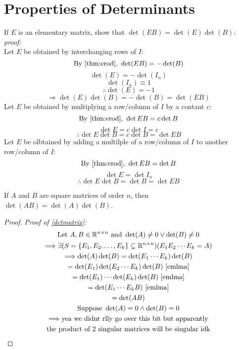 \section{Properties of Determinants}
\begin{lemma}\label{emlma}
    If \(E\) is an elementary matrix, show that \(\det(EB) =\det(E)\det(B)\):\\
    \emph{proof:}\\
    Let \(E\) be obtained by interchanging rows of \(I\):
    \[
        \text{By \ref{thm:erod}, } \det(EB)=-\det(B)
    \]
    \[
        \det(E)=-\det(I_n)
    \]
    \[
        \det(I_n)\equiv 1
    \]
    \[
        \therefore\det(E)=-1
    \]
    \[
        \Rightarrow \det(E)\det(B)=-\det(B)=\det(EB)
    \]
    Let \(E\) be obtained by multiplying a row/column of \(I\) by a contant \(c\):
    \[
        \text{By \ref{thm:erod}, } \det{EB}=c\det{B}
    \]
    \[
        \det{E}=c\det{I}=c
    \]
    \[
        \therefore\det{E}\det{B}=c\det{B}=\det{EB}
    \]
    Let \(E\) be olbtained by adding a multilple of a row/column of \(I\) to another row/column of \(I\):
    \[
        \text{By \ref{thm:erod}, } \det{EB}=\det{B}
    \]
    \[
        \det{E}=\det{I_n}
    \]
    \[
        \therefore\det{E}\det{B}=\det{B}=\det{EB}
    \]
\end{lemma}
\begin{theorem}\label{detmatrix}
    If \(A\) and \(B\)  are square matrices of order \(n\), then \(\det(AB)=\det(A)\det(B)\).
\end{theorem}
\begin{proof}
    \emph{Proof of \ref{detmatrix}:}
    \begin{gather*}
        \text{Let }A,B\in\mathbb{R} ^{n\times n}\text{ and } \det (A)\neq 0\lor \det (B)\neq 0\\
        \Longrightarrow \exists (S=\{ E_1,E_2,\ldots,E_k \} \subsetneq \mathbb{R} ^{n\times n})(E_1 E_2 \cdots E_k=A)\\
        \Longrightarrow \det (A)\det (B)=\det (E_1 \cdots E_k)\det (B)\\
        =\det (E_1)\det (E_2\cdots E_k)\det (B)\text{ \ref{emlma}}\\
        =\det (E_1)\cdots\det(E_k)\det (B)\text{ \ref{emlma}}\\
        =\det(E_1\cdots E_k B)\text{ \ref{emlma}}\\
        =\det (AB)\\
        \text{Suppose }\det (A) =0\land \det (B)=0\\
        \Longrightarrow \text{yea we didnt rlly go over this bit but apparently}\\
        \text{the product of 2 singular matrices will be singular idk}  
    \end{gather*}
\end{proof}

